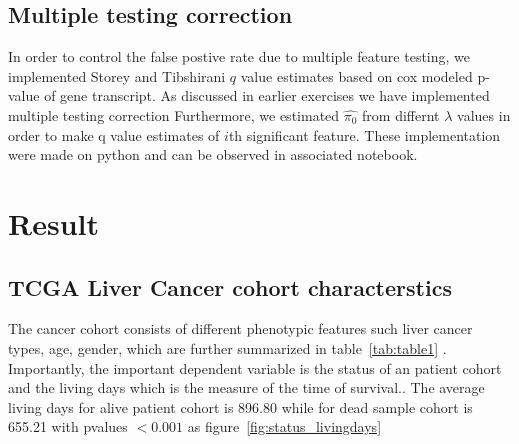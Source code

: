 \documentclass{article}
\begin{document}
	\subsection {Multiple testing correction}
	In order to control the false postive rate due to multiple feature testing, we implemented Storey and Tibshirani \cite{storey2003statistical} $q$ value estimates based on cox modeled p-value of gene transcript. As discussed in earlier exercises we have  implemented multiple testing correction Furthermore, we estimated $\hat {\pi_0}$ from differnt $\lambda$ values in order to make q value estimates  of $i$th significant feature. These implementation were made on python and can be observed in associated notebook.

 \section{Result}
	\subsection {TCGA Liver Cancer cohort characterstics}
 
The cancer cohort consists of different phenotypic features such liver cancer types, age, gender, which are further summarized in table~\ref{tab:table1} . Importantly, the important dependent variable is the status of an patient cohort  and the  living days which is the measure of the time of survival.. The average living days for alive  patient cohort is  896.80 while for dead sample cohort is 655.21 with pvalues $< 0.001$ as figure~\ref{fig:status_livingdays}
 
\end{document}
